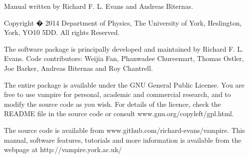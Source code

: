 \noindent Manual written by Richard F. L. Evans and Andreas Biternas.\\
\par
\noindent Copyright � 2014 Department of Physics, The University of York, Heslington, York, YO10 5DD. All rights Reserved.\\
\par
\noindent The \vampire software package is principally developed and maintained by Richard F. L. Evans. Code contributors: Weijia Fan, Phanwadee Chureemart, Thomas Ostler, Joe Barker, Andreas Biternas and Roy Chantrell.\\
\par
\noindent The entire \vampire package is available under the GNU General Public License. You are free to use vampire for personal, academic and commercial research, and to modify the source code as you wish. For details of the licence, check the README file in the source code or consult www.gnu.org/copyleft/gpl.html.\\
\par
\noindent The \vampire source code is available from www.github.com/richard-evans/vampire. This manual, software features, tutorials and more information is available from the \vampire webpage at http://vampire.york.ac.uk/\\
